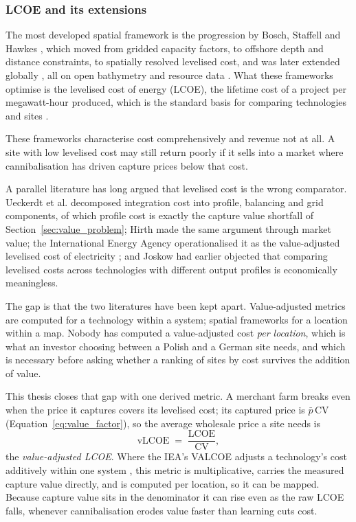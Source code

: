 \subsubsection{LCOE and its extensions}
\label{sec:vlcoe_lit}

The most developed spatial framework is the progression by Bosch, Staffell
and Hawkes \cite{Bosch2017, Bosch2018, Bosch2019}, which moved from gridded
capacity factors, to offshore depth and distance constraints, to spatially
resolved levelised cost, and was later extended globally \cite{Chu2020}, all
on open bathymetry and resource data \cite{GEBCO2014, GlobalWindAtlas}.
What these frameworks optimise is the levelised cost of energy (LCOE), the
lifetime cost of a project per megawatt-hour produced, which is the standard
basis for comparing technologies and sites \cite{IRENA2025Costs, BCG2025}.

These frameworks characterise cost comprehensively and revenue not at all. A
site with low levelised cost may still return poorly if it sells into a market
where cannibalisation has driven capture prices below that cost.

A parallel literature has long argued that levelised cost is the wrong
comparator. Ueckerdt et al. \cite{Ueckerdt2013} decomposed integration cost into
profile, balancing and grid components, of which profile cost is exactly the
capture value shortfall of Section~\ref{sec:value_problem}; Hirth
\cite{Hirth2015} made the same argument through market value; the International
Energy Agency operationalised it as the value-adjusted levelised cost of
electricity \cite{IEAValcoe2018}; and Joskow \cite{Joskow2019} had earlier
objected that comparing levelised costs across technologies with different
output profiles is economically meaningless.

The gap is that the two literatures have been kept apart. Value-adjusted metrics
are computed for a technology within a system; spatial frameworks for a location
within a map. Nobody has computed a value-adjusted cost \textit{per location},
which is what an investor choosing between a Polish and a German site needs, and
which is necessary before asking whether a ranking of sites by cost survives the
addition of value.

This thesis closes that gap with one derived metric. A merchant farm breaks
even when the price it captures covers its levelised cost; its captured price
is $\bar p\,\mathrm{CV}$ (Equation~\ref{eq:value_factor}), so the average
wholesale price a site needs is
%
\begin{equation}
  \mathrm{vLCOE} \;=\; \frac{\mathrm{LCOE}}{\mathrm{CV}},
  \label{eq:vlcoe}
\end{equation}
%
the \emph{value-adjusted LCOE}. Where the IEA's VALCOE adjusts a technology's
cost additively within one system \cite{IEAValcoe2018}, this metric is
multiplicative, carries the measured capture value directly, and is computed per
location, so it can be mapped. Because capture value sits in the denominator it
can rise even as the raw LCOE falls, whenever cannibalisation erodes value
faster than learning cuts cost.

